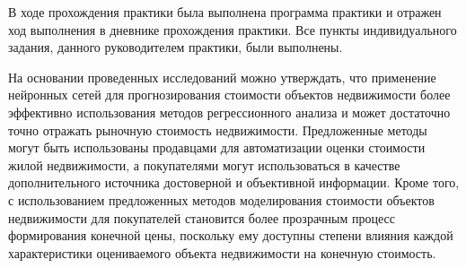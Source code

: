 

В ходе прохождения практики была выполнена программа практики и отражен ход выполнения в дневнике прохождения практики.
Все пункты индивидуального задания, данного руководителем практики, были выполнены.

На основании проведенных исследований можно утверждать, что применение нейронных сетей для прогнозирования
стоимости объектов недвижимости более эффективно использования методов регрессионного анализа и может достаточно
точно отражать рыночную стоимость недвижимости. Предложенные методы могут быть
использованы продавцами для автоматизации оценки стоимости жилой недвижимости, а покупателями могут использоваться в 
качестве дополнительного источника достоверной и объективной информации. Кроме того, с использованием предложенных
методов моделирования стоимости объектов недвижимости для покупателей становится более
прозрачным процесс формирования конечной цены, поскольку ему доступны степени влияния каждой характеристики оцениваемого
объекта недвижимости на конечную стоимость.
